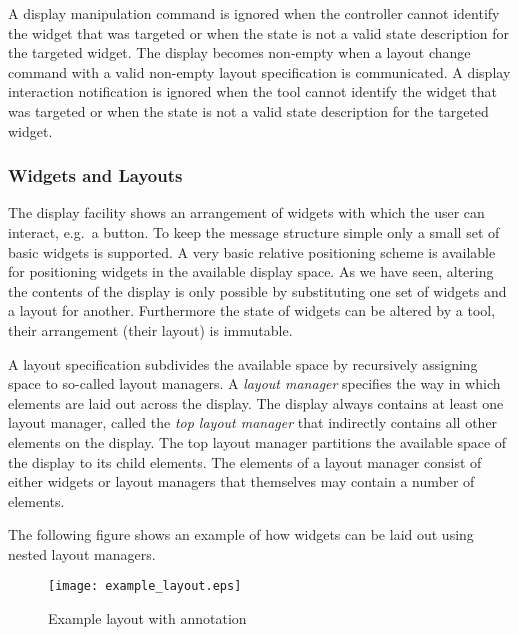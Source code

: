 \documentclass{article}
\begin{document}
   \noindent A display manipulation command is ignored when the controller
   cannot identify the widget that was targeted or when the state is not a
   valid state description for the targeted widget. The display becomes
   non-empty when a layout change command with a valid non-empty layout
   specification is communicated.  A display interaction notification is
   ignored when the tool cannot identify the widget that was targeted or when
   the state is not a valid state description for the targeted widget. 
   
   \subsubsection*{Widgets and Layouts} \label{subsection:widgets_and_layout}

    The display facility shows an arrangement of widgets with which the user
    can interact, e.g.\ a button. To keep the message structure simple only a
    small set of basic widgets is supported. A very basic relative positioning
    scheme is available for positioning widgets in the available display space.
    As we have seen, altering the contents of the display is only possible by
    substituting one set of widgets and a layout for another.  Furthermore the
    state of widgets can be altered by a tool, their arrangement (their layout)
    is immutable.

    A layout specification subdivides the available space by recursively
    assigning space to so-called layout managers. A \textit{layout manager}
    specifies the way in which elements are laid out across the display. The
    display always contains at least one layout manager, called the \textit{top
    layout manager} that indirectly contains all other elements on the display.
    The top layout manager partitions the available space of the display to its
    child elements. The elements of a layout manager consist of either widgets
    or layout managers that themselves may contain a number of elements.
    
    The following figure shows an example of how widgets can be laid out
    using nested layout managers.

    \begin{figure}[H]
     \begin{center}
      \texttt{[image: example\_layout.eps]}
     \end{center}
     \caption{Example layout with annotation}
     \label{figure:example_layout}
    \end{figure}
\end{document}
